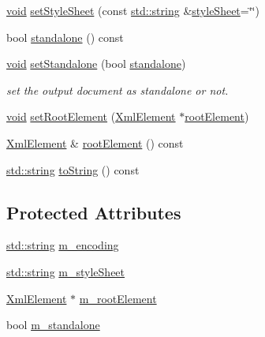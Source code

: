 \begin{DoxyCompactItemize}
\item 
\hyperlink{wglew_8h_aeea6e3dfae3acf232096f57d2d57f084}{void} \hyperlink{class_xml_document_a63cfdd276a9812900cd7739758effd78}{set\-Style\-Sheet} (const \hyperlink{glew_8h_ae84541b4f3d8e1ea24ec0f466a8c568b}{std\-::string} \&\hyperlink{class_xml_document_ae0a7e5e1f28b179c31bee66481b18c03}{style\-Sheet}=\char`\"{}\char`\"{})
\item 
bool \hyperlink{class_xml_document_ab3ff5eb5c5df20453b4fc6f5b9bcff6e}{standalone} () const 
\item 
\hyperlink{wglew_8h_aeea6e3dfae3acf232096f57d2d57f084}{void} \hyperlink{class_xml_document_a3cc9d3452daba0bda758ee7add075827}{set\-Standalone} (bool \hyperlink{class_xml_document_ab3ff5eb5c5df20453b4fc6f5b9bcff6e}{standalone})
\begin{DoxyCompactList}\small\item\em set the output document as standalone or not. \end{DoxyCompactList}\item 
\hyperlink{wglew_8h_aeea6e3dfae3acf232096f57d2d57f084}{void} \hyperlink{class_xml_document_a2b419770905e48914ed6dba3990061cd}{set\-Root\-Element} (\hyperlink{class_xml_element}{Xml\-Element} $\ast$\hyperlink{class_xml_document_a87f0ea5104985af47f6a2aea5517aeb9}{root\-Element})
\item 
\hyperlink{class_xml_element}{Xml\-Element} \& \hyperlink{class_xml_document_a87f0ea5104985af47f6a2aea5517aeb9}{root\-Element} () const 
\item 
\hyperlink{glew_8h_ae84541b4f3d8e1ea24ec0f466a8c568b}{std\-::string} \hyperlink{class_xml_document_aa75e20c19ee0719af2e5b573db02f5a4}{to\-String} () const 
\end{DoxyCompactItemize}
\subsection*{Protected Attributes}
\begin{DoxyCompactItemize}
\item 
\hyperlink{glew_8h_ae84541b4f3d8e1ea24ec0f466a8c568b}{std\-::string} \hyperlink{class_xml_document_a3a5338a6b02b176a3d50e6665ce1b41d}{m\-\_\-encoding}
\item 
\hyperlink{glew_8h_ae84541b4f3d8e1ea24ec0f466a8c568b}{std\-::string} \hyperlink{class_xml_document_a8564bf7c7d4856e6aecc2d7b7be6782b}{m\-\_\-style\-Sheet}
\item 
\hyperlink{class_xml_element}{Xml\-Element} $\ast$ \hyperlink{class_xml_document_a83e49d668c247017d1681a9989958280}{m\-\_\-root\-Element}
\item 
bool \hyperlink{class_xml_document_a0c2dd2a48772ad62209a268156af3baa}{m\-\_\-standalone}
\end{DoxyCompactItemize}


